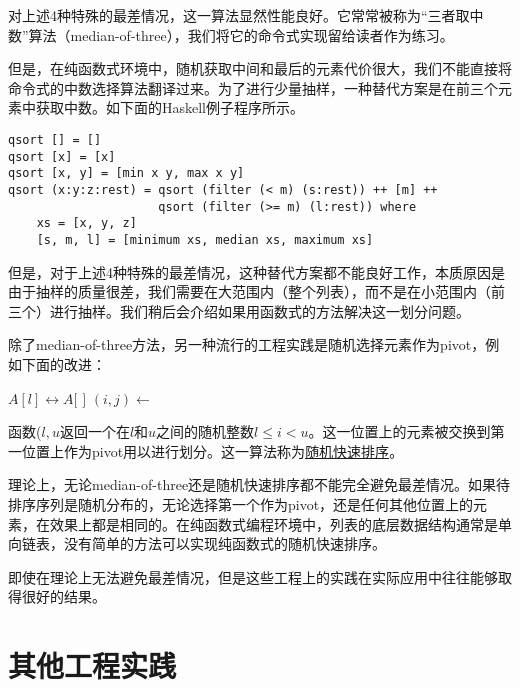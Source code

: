 \documentclass[UTF8]{article}
\begin{document}
对上述4种特殊的最差情况，这一算法显然性能良好。它常常被称为“三者取中数”算法（median-of-three），我们将它的命令式实现留给读者作为练习。

但是，在纯函数式环境中，随机获取中间和最后的元素代价很大，我们不能直接将命令式的中数选择算法翻译过来。为了进行少量抽样，一种替代方案是在前三个元素中获取中数。如下面的Haskell例子程序所示。

\lstset{language=Haskell}
\begin{lstlisting}[style=Haskell]
qsort [] = []
qsort [x] = [x]
qsort [x, y] = [min x y, max x y]
qsort (x:y:z:rest) = qsort (filter (< m) (s:rest)) ++ [m] ++
                     qsort (filter (>= m) (l:rest)) where
    xs = [x, y, z]
    [s, m, l] = [minimum xs, median xs, maximum xs]
\end{lstlisting}

但是，对于上述4种特殊的最差情况，这种替代方案都不能良好工作，本质原因是由于抽样的质量很差，我们需要在大范围内（整个列表），而不是在小范围内（前三个）进行抽样。我们稍后会介绍如果用函数式的方法解决这一划分问题。

除了median-of-three方法，另一种流行的工程实践是随机选择元素作为pivot，例如下面的改进：

\begin{algorithmic}[1]
    \State {} $A[l] \leftrightarrow A[$  $]$
    \State $(i, j) \gets $ 
    \State {}
    \State {}
  \EndIf
\EndProcedure
\end{algorithmic}

函数($l, u$返回一个在$l$和$u$之间的随机整数$l \leq i < u$。这一位置上的元素被交换到第一位置上作为pivot用以进行划分。这一算法称为\underline{随机快速排序}\cite{CLRS}。

理论上，无论median-of-three还是随机快速排序都不能完全避免最差情况。如果待排序序列是随机分布的，无论选择第一个作为pivot，还是任何其他位置上的元素，在效果上都是相同的。在纯函数式编程环境中，列表的底层数据结构通常是单向链表，没有简单的方法可以实现纯函数式的随机快速排序。

即使在理论上无法避免最差情况，但是这些工程上的实践在实际应用中往往能够取得很好的结果。

\section{其他工程实践}
\end{document}
